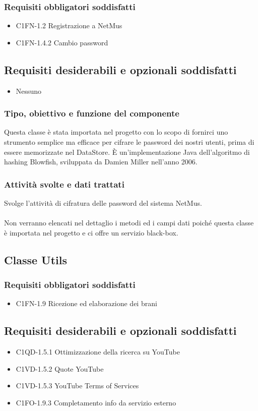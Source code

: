 \subsubsection*{Requisiti obbligatori soddisfatti}
\begin{itemize}
    \item C1FN-1.2 Registrazione a NetMus
    \item C1FN-1.4.2 Cambio password
\end{itemize}
\subsection*{Requisiti desiderabili e opzionali soddisfatti}
\begin{itemize}
    \item Nessuno
\end{itemize}
\subsubsection*{Tipo, obiettivo e funzione del componente}
Questa classe \`e stata importata nel progetto con lo scopo di fornirci uno
strumento semplice ma efficace per cifrare le password dei nostri utenti, prima
di essere memorizzate nel DataStore. \`E un'implementazione Java dell'algoritmo
di hashing Blowfish, sviluppata da Damien Miller nell'anno 2006.
 \subsubsection*{Attivit\`a svolte e dati trattati}
Svolge l'attivit\`a di cifratura delle password del sistema NetMus.
\\\\
Non verranno elencati nel dettaglio i metodi ed i campi dati poich\'e questa
classe \`e importata nel progetto e ci offre un servizio black-box.

\subsection{Classe Utils}
\subsubsection*{Requisiti obbligatori soddisfatti}
\begin{itemize}
    \item C1FN-1.9 Ricezione ed elaborazione dei brani
\end{itemize}
\subsection*{Requisiti desiderabili e opzionali soddisfatti}
\begin{itemize}
    \item C1QD-1.5.1 Ottimizzazione della ricerca su YouTube
    \item C1VD-1.5.2 Quote YouTube
    \item C1VD-1.5.3 YouTube Terms of Services
    \item C1FO-1.9.3 Completamento info da servizio esterno
\end{itemize}
